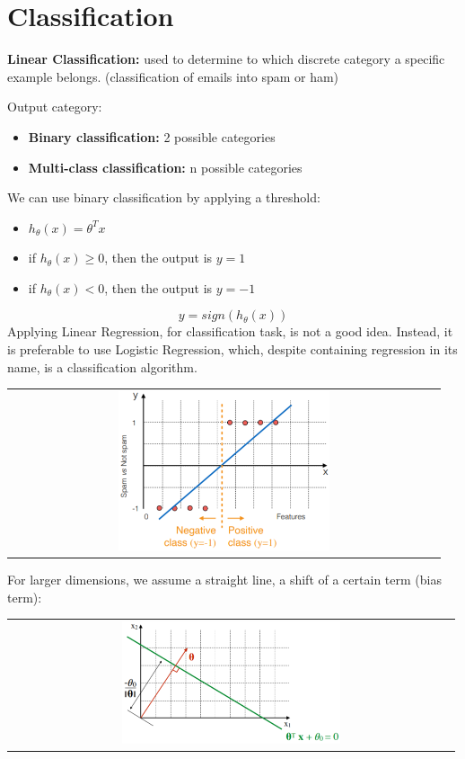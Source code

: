 \section{Classification}
\begin{mdframed}
    \textbf{Linear Classification:} used to determine to which discrete category a specific example belongs. (classification of emails into spam or ham)
\end{mdframed}
Output category:
\begin{itemize}
    \item \textbf{Binary classification:} 2 possible categories
    \item \textbf{Multi-class classification:} n possible categories
\end{itemize}
We can use binary classification by applying a threshold:
\begin{itemize}
    \item $h_\theta(x) = \theta^Tx$
    \item if $h_\theta(x) \geq 0$, then the output is $y = 1$
    \item if $h_\theta(x) < 0$, then the output is $y = -1$
\end{itemize}
\begin{equation} \tag{Classification}
    y = sign(h_\theta(x))
\end{equation}
Applying Linear Regression, for classification task, is not a good idea. Instead, it is preferable to use Logistic Regression, which, despite containing regression in its name, is a classification algorithm.
\noindent
\begin{center}
    \begin{tabular}{c}
        \includegraphics[width=0.5\textwidth]{images/Classification1.png}
    \end{tabular}
\end{center}
For larger dimensions, we assume a straight line, a shift of a certain term (bias term):
\begin{center}
    \begin{tabular}{c}
        \includegraphics[width=0.5\textwidth]{images/Classification2.png}
    \end{tabular}
\end{center}
